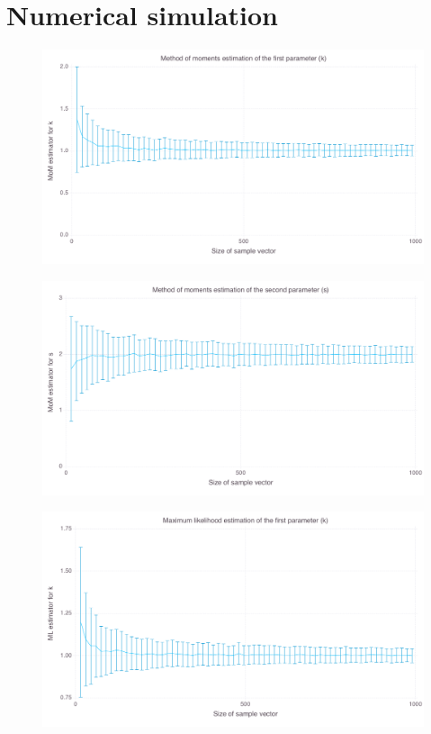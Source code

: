 \documentclass[final]{aomart}
\newtheorem[{}\it]{thm}{Theorem}[section]
\theoremstyle{definition}
\newtheorem*[{}\it]{notation}{Notation}
\numberwithin{equation}{section}
\begin{document}
\section{Numerical simulation}
\begin{figure}[H]
	\centering
	\includegraphics[width=\textwidth]{img/k_mom.png}
\end{figure}
\begin{figure}[H]
	\centering
	\includegraphics[width=\textwidth]{img/s_mom.png}
\end{figure}
\begin{figure}[H]
	\centering
	\includegraphics[width=\textwidth]{img/k_ml.png}
\end{figure}
\end{document}
